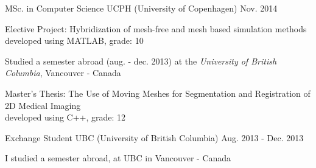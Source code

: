 
% 

\begin{cventries}




\cventry
{MSc. in Computer Science} %
{UCPH (University of Copenhagen)} %
{} %
{Nov. 2014} %
{ %
\begin{cvitems}
\item {Elective Project: Hybridization of mesh-free and mesh based simulation methods\\
		\phantom{x}\scriptsize{developed using MATLAB, grade: 10}}
\item {Studied a semester abroad (aug. - dec. 2013) at the \textit{University of British Columbia}, Vancouver - Canada}
\item {Master's Thesis: The Use of Moving Meshes for Segmentation and Registration of 2D Medical Imaging\\
		\phantom{x}\scriptsize{developed using C++, grade: 12}}
\end{cvitems}
}

\cventry
{Exchange Student} %
{UBC (University of British Columbia)} %
{} %
{Aug. 2013 - Dec. 2013} %
{ %
\begin{cvitems}
\item {I studied a semester abroad, at UBC in Vancouver - Canada}
\end{cvitems}
}


\end{cventries}
